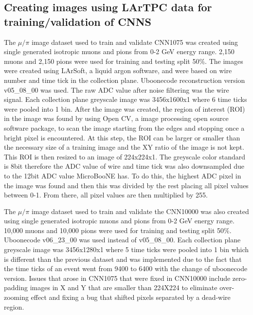 \subsection{Creating images using LArTPC data for training/validation of CNNS}\label{image_making}
The $\mu/\pi$ image dataset used to train and validate CNN1075 was created using single generated isotropic muons and pions from 0-2 GeV energy range. 2,150 muons and 2,150 pions were used for training and testing split 50\%. The images were created using LArSoft, a liquid argon software, and were based on wire number and time tick in the collection plane. Uboonecode reconstruction version v05{\_}08{\_}00 was used. The raw ADC value after noise filtering was the wire signal. Each collection plane greyscale image was 3456x1600x1 where 6 time ticks were pooled into 1 bin. After the image was created, the region of interest (ROI) in the image was found by using Open CV, a image processing open source software package, to scan the image starting from the edges and stopping once a bright pixel is encountered. At this step, the ROI can be larger or smaller than the necessary size of a training image and the XY ratio of the image is not kept. This ROI is then resized to an image of 224x224x1. The greyscale color standard is 8bit therefore the ADC value of wire and time tick was also downsampled due to the 12bit ADC value MicroBooNE has. To do this, the highest ADC pixel in the image was found and then this was divided by the rest placing all pixel values between 0-1. From there, all pixel values are then multiplied by 255.

The $\mu/\pi$ image dataset used to train and validate the CNN10000 was also created using single generated isotropic muons and pions from 0-2 GeV energy range. 10,000 muons and 10,000 pions were used for training and testing split 50\%. Uboonecode v06{\_}23{\_}00 was used instead of v05{\_}08{\_}00. Each collection plane greyscale image was 3456x1280x1 where 5 time ticks were pooled into 1 bin which is different than the previous dataset and was implemented due to the fact that the time ticks of an event went from 9400 to 6400 with the change of uboonecode version. Issues that arose in CNN1075 that were fixed in CNN10000 include zero-padding images in X and Y that are smaller than 224X224 to eliminate over-zooming effect and fixing a bug that shifted pixels separated by a dead-wire region.

